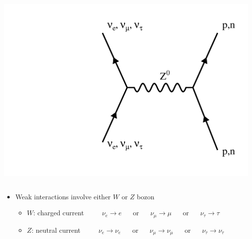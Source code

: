 \documentclass[10pt,professionalfonts,xcolor=table]{beamer}
\begin{document}
\begin{frame}
\begin{columns}
  \includegraphics[height=0.37\textheight, angle=-90]{figures/feynman/ncHad.pdf}
  \end{columns}
\gap
    \begin{itemize}
    \item Weak interactions involve either $W$ or $Z$ bozon
      \begin{itemize}
      \item $W$: charged current
      \bong ~~~~ $\nu_e \rightarrow e$ ~~ or ~~ $\nu_\mu \rightarrow \mu$ ~~ or ~~ $\nu_\tau \rightarrow \tau$
      \item $Z$: neutral current
      \bong ~~~~ $\nu_e \rightarrow \nu_e$ ~~ or ~~ $\nu_\mu \rightarrow \nu_\mu$ ~~ or ~~ $\nu_\tau \rightarrow \nu_\tau$
      \end{itemize}
    \end{itemize}

\end{frame}
\end{document}
